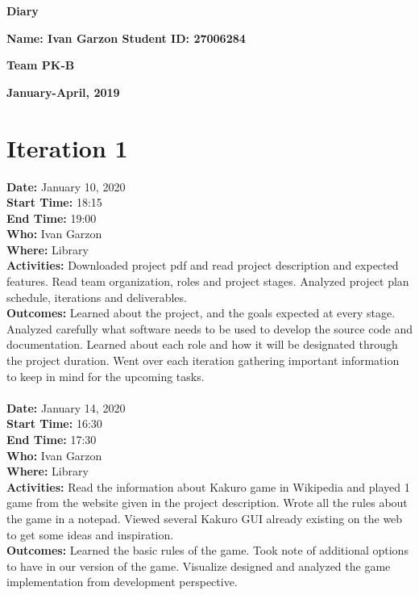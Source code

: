 \documentclass[12pt]{article}
\begin{document}
\vspace*{0.2in}
\centerline{\bf\Large Diary}

\vspace*{0.2in}
\centerline{\bf\Large Name: Ivan Garzon   Student ID: 27006284}

\vspace*{0.2in}
\centerline{\bf\Large Team PK-B}

\vspace*{0.2in}
\centerline{\bf\Large January-April, 2019}

\section{Iteration 1}

{\bf Date:} January 10, 2020\\
{\bf Start Time:} 18:15\\
{\bf End Time:} 19:00 \\
{\bf Who:} Ivan Garzon \\
{\bf Where:} Library \\
{\bf Activities:} Downloaded project pdf and read project description and expected features. Read team organization, roles and project stages. Analyzed project plan schedule, iterations and deliverables.\\
{\bf Outcomes:} Learned about the project, and the goals expected at every stage. Analyzed carefully what software needs to be used to develop the source code and documentation. Learned about each role and how it will be designated through the project duration. Went over each iteration gathering important information to keep in mind for the upcoming tasks.\\\\

{\bf Date:} January 14, 2020\\
{\bf Start Time:} 16:30\\
{\bf End Time:} 17:30\\
{\bf Who:} Ivan Garzon\\
{\bf Where:} Library\\
{\bf Activities:} Read the information about Kakuro game in Wikipedia and played 1 game from the website given in the project description. Wrote all the rules about the game in a notepad. Viewed several Kakuro GUI already existing on the web to get some ideas and inspiration.\\
{\bf Outcomes:} Learned the basic rules of the game. Took note of additional options to have in our version of the game. Visualize designed and analyzed the game implementation from development perspective.\\\\
\end{document}
